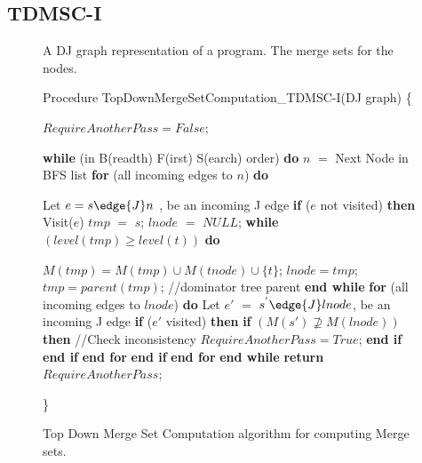 \subsection{TDMSC-I}

\begin{figure}[!ht]
\centering
\begin{minipage}[t]{5in}
 A DJ graph representation of a program.
 The merge sets for the nodes.

\setcounter{linectr}{0}

Procedure TopDownMergeSetComputation\_TDMSC-I(DJ graph)
\{
\begin{code}

 $RequireAnotherPass=False$;

 {\bf while} (in B(readth) F(irst) S(earch) order) {\bf do} \label{C:bfs}
      $n$ $=$ Next Node in BFS list
      {\bf for} (all incoming edges to $n$) {\bf do} \label{C:jedge}

          Let $e = s \edge{J} n$ , be an incoming J edge
          {\bf if} ($e$ not visited) {\bf then}
              Visit($e$) 
              $tmp$ $=$ $s$;
              $lnode$ $=$ $NULL$;
              {\bf while} $(level(tmp)\ge level(t))$ {\bf do} \label{C:mwhiles}

                   $M(tmp)=M(tmp)\cup M(tnode)\cup \{t\}$;
                   $lnode=tmp$;
                   $tmp=parent(tmp)$; //dominator tree parent
              {\bf end while} \label{C:mwhilee}
              {\bf for} (all incoming edges to $lnode$) {\bf do} \label{C:lnode}
                  Let $e'$ $=$ $s^{'} \edge{J} lnode$, be an incoming J edge
                  {\bf if} ($e'$ visited) {\bf then}
                     {\bf if} $(M(s') \not\supseteq M(lnode))$ {\bf then} //Check inconsistency
                         $RequireAnotherPass = True$;
                     {\bf end if}
                  {\bf end if}
              {\bf end for}
          {\bf end if}
     {\bf end for}
 {\bf end while}
 {\bf return} $RequireAnotherPass$;
\end{code}
\}
\end{minipage}
\caption{Top Down Merge Set Computation algorithm for computing Merge sets.}
\label{F:tdmsc}
\end{figure} 

